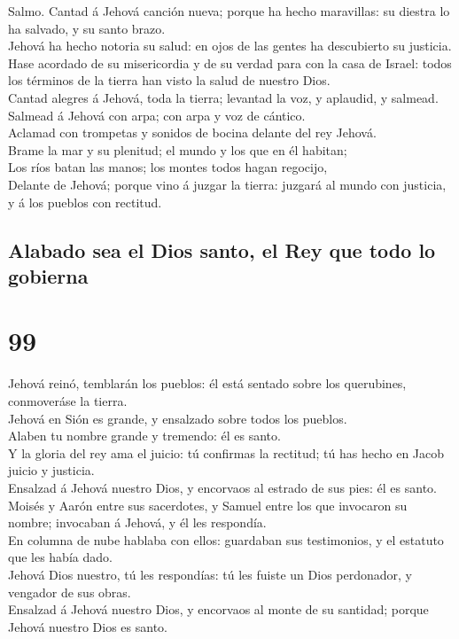  Salmo. Cantad á Jehová canción nueva; porque ha hecho
maravillas: su diestra lo ha salvado, y su santo brazo.\\
 Jehová ha hecho notoria su salud: en ojos de las gentes
ha descubierto su justicia.\\
 Hase acordado de su misericordia y de su verdad para con
la casa de Israel: todos los términos de la tierra han visto la salud de
nuestro Dios.\\
 Cantad alegres á Jehová, toda la tierra; levantad la voz,
y aplaudid, y salmead.\\
 Salmead á Jehová con arpa; con arpa y voz de cántico.\\
 Aclamad con trompetas y sonidos de bocina delante del rey
Jehová.\\
 Brame la mar y su plenitud; el mundo y los que en él
habitan;\\
 Los ríos batan las manos; los montes todos hagan
regocijo,\\
 Delante de Jehová; porque vino á juzgar la tierra:
juzgará al mundo con justicia, y á los pueblos con rectitud.

\hypertarget{alabado-sea-el-dios-santo-el-rey-que-todo-lo-gobierna}{%
\subsection{Alabado sea el Dios santo, el Rey que todo lo
gobierna}\label{alabado-sea-el-dios-santo-el-rey-que-todo-lo-gobierna}}

\hypertarget{section-19-99}{%
\section{99}\label{section-19-99}}

 Jehová reinó, temblarán los pueblos: él está sentado
sobre los querubines, conmoveráse la tierra.\\
 Jehová en Sión es grande, y ensalzado sobre todos los
pueblos.\\
 Alaben tu nombre grande y tremendo: él es santo.\\
 Y la gloria del rey ama el juicio: tú confirmas la
rectitud; tú has hecho en Jacob juicio y justicia.\\
 Ensalzad á Jehová nuestro Dios, y encorvaos al estrado de
sus pies: él es santo.\\
 Moisés y Aarón entre sus sacerdotes, y Samuel entre los
que invocaron su nombre; invocaban á Jehová, y él les respondía.\\
 En columna de nube hablaba con ellos: guardaban sus
testimonios, y el estatuto que les había dado.\\
 Jehová Dios nuestro, tú les respondías: tú les fuiste un
Dios perdonador, y vengador de sus obras.\\
 Ensalzad á Jehová nuestro Dios, y encorvaos al monte de
su santidad; porque Jehová nuestro Dios es santo.


